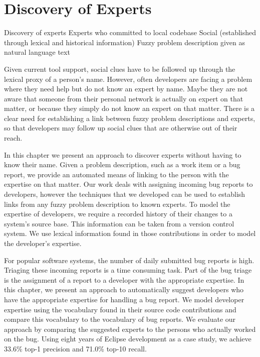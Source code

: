 
\chapter{Discovery of Experts}
\label{the chapter on bug reports}

\infobox
	{Discovery of experts}
	{Experts who committed to local codebase}
	{Social (established through lexical and historical information)}
	{Fuzzy problem description given as natural language text}

Given current tool support, social clues have to be followed up through the lexical proxy of a person's name. However, often developers are facing a problem where they need help but do not know an expert by name. Maybe they are not aware that someone from their personal network is actually on expert on that matter, or because they simply do not know an expert on that matter. There is a clear need for establishing a link between fuzzy problem descriptions and experts, so that developers may follow up social clues that are otherwise out of their reach. 

In this chapter we present an approach to discover experts without having to know their name. Given a problem description, such as a work item or a bug report, we provide an automated means of linking to the person with the expertise on that matter. Our work deals with assigning incoming bug reports to developers, however the techniques that we developed can be used to establish links from any fuzzy problem description to known experts. To model the expertise of developers, we require a recorded history of their changes to a system's source base. This information can be taken from a version control system. We use lexical information found in those contributions in order to model the developer's expertise. 

\asteriskasteriskasterisk

For popular software systems, the number of daily submitted bug reports is high. Triaging these incoming reports is a time consuming task. Part of the bug triage is the assignment of a report to a developer with the appropriate expertise. In this chapter, we present an approach to automatically suggest developers who have the appropriate expertise for handling a bug report. We model developer expertise using the vocabulary found in their source code contributions and compare this vocabulary to the vocabulary of bug reports. We evaluate our approach by comparing the suggested experts to the persons who actually worked on the bug. Using eight years of Eclipse development as a case study, we achieve 33.6\% top-1 precision and 71.0\% top-10 recall.

